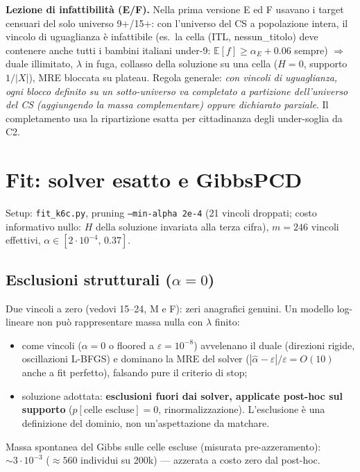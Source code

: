 \documentclass[11pt,a4paper]{article}
\newcommand{\code}[1]{\texttt{#1}}
\begin{document}
\medskip\noindent\textbf{Lezione di infattibilit\`a (E/F).} Nella prima
versione E ed F usavano i target censuari del solo universo 9+/15+: con
l'universo del CS a popolazione intera, il vincolo di uguaglianza \`e
infattibile (es.\ la cella (ITL, nessun\_titolo) deve contenere anche tutti i
bambini italiani under-9: $\mathbb{E}[f] \ge \alpha_E + 0.06$ sempre)
$\Rightarrow$ duale illimitato, $\lambda$ in fuga, collasso della soluzione su
una cella ($H=0$, supporto $1/|X|$), MRE bloccata su plateau. Regola generale:
\emph{con vincoli di uguaglianza, ogni blocco definito su un sotto-universo va
completato a partizione dell'universo del CS (aggiungendo la massa
complementare) oppure dichiarato parziale}. Il completamento usa la
ripartizione esatta per cittadinanza degli under-soglia da C2.

\section{Fit: solver esatto e GibbsPCD}
\label{sec:fit}
Setup: \code{fit\_k6c.py}, pruning \code{--min-alpha 2e-4} (21 vincoli
droppati; costo informativo nullo: $H$ della soluzione invariata alla terza
cifra), $m=246$ vincoli effettivi, $\alpha \in [2\cdot10^{-4},\, 0.37]$.

\subsection{Esclusioni strutturali ($\alpha=0$)}
Due vincoli a zero (vedovi 15--24, M e F): zeri anagrafici genuini. Un modello
log-lineare non pu\`o rappresentare massa nulla con $\lambda$ finito:
\begin{itemize}[leftmargin=*]
  \item come vincoli ($\alpha=0$ o floored a $\varepsilon=10^{-8}$)
  avvelenano il duale (direzioni rigide, oscillazioni L-BFGS) e dominano la
  MRE del solver ($|\hat\alpha - \varepsilon|/\varepsilon = O(10)$ anche a fit
  perfetto), falsando pure il criterio di stop;
  \item soluzione adottata: \textbf{esclusioni fuori dai solver, applicate
  post-hoc sul supporto} ($p[\text{celle escluse}]=0$, rinormalizzazione).
  L'esclusione \`e una definizione del dominio, non un'aspettazione da matchare.
\end{itemize}
Massa spontanea del Gibbs sulle celle escluse (misurata pre-azzeramento):
$\sim 3\cdot10^{-3}$ ($\approx 560$ individui su 200k) --- azzerata a costo
zero dal post-hoc.
\end{document}
